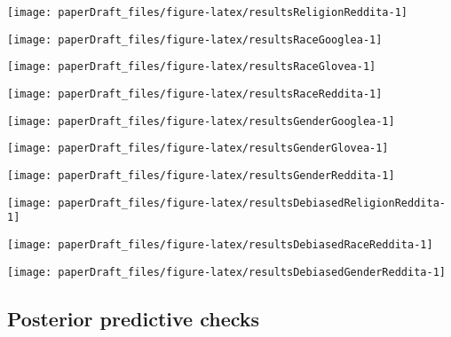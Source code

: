 \documentclass[
  12pt,
  dvipsnames,enabledeprecatedfontcommands]{scrartcl}
\begin{document}
\begin{center}\texttt{[image: paperDraft\_files/figure-latex/resultsReligionReddita-1]} \end{center}

\begin{center}\texttt{[image: paperDraft\_files/figure-latex/resultsRaceGooglea-1]} \end{center}

\begin{center}\texttt{[image: paperDraft\_files/figure-latex/resultsRaceGlovea-1]} \end{center}

\begin{center}\texttt{[image: paperDraft\_files/figure-latex/resultsRaceReddita-1]} \end{center}

\begin{center}\texttt{[image: paperDraft\_files/figure-latex/resultsGenderGooglea-1]} \end{center}

\begin{center}\texttt{[image: paperDraft\_files/figure-latex/resultsGenderGlovea-1]} \end{center}

\begin{center}\texttt{[image: paperDraft\_files/figure-latex/resultsGenderReddita-1]} \end{center}

\begin{center}\texttt{[image: paperDraft\_files/figure-latex/resultsDebiasedReligionReddita-1]} \end{center}

\begin{center}\texttt{[image: paperDraft\_files/figure-latex/resultsDebiasedRaceReddita-1]} \end{center}

\begin{center}\texttt{[image: paperDraft\_files/figure-latex/resultsDebiasedGenderReddita-1]} \end{center}

\hypertarget{posterior-predictive-checks}{%
\subsection{Posterior predictive
checks}\label{posterior-predictive-checks}}
\end{document}
